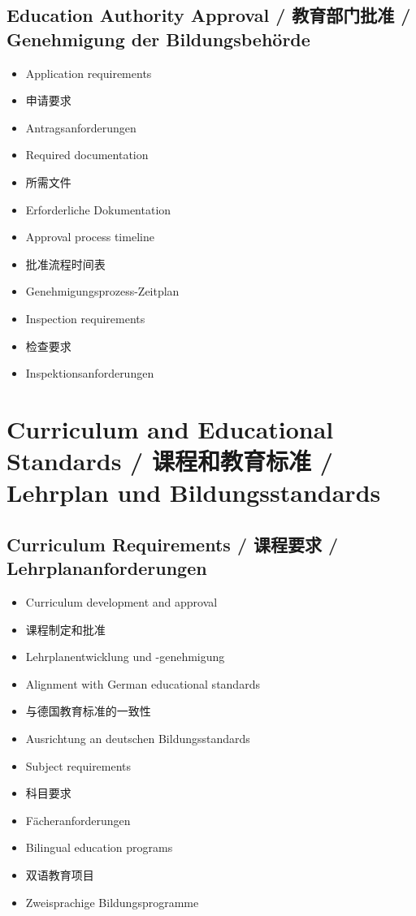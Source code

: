 \subsection{Education Authority Approval / 教育部门批准 / Genehmigung der Bildungsbehörde}
\begin{itemize}
    \item Application requirements
    \item 申请要求
    \item Antragsanforderungen
    \item Required documentation
    \item 所需文件
    \item Erforderliche Dokumentation
    \item Approval process timeline
    \item 批准流程时间表
    \item Genehmigungsprozess-Zeitplan
    \item Inspection requirements
    \item 检查要求
    \item Inspektionsanforderungen
\end{itemize}

\section{Curriculum and Educational Standards / 课程和教育标准 / Lehrplan und Bildungsstandards}

\subsection{Curriculum Requirements / 课程要求 / Lehrplananforderungen}
\begin{itemize}
    \item Curriculum development and approval
    \item 课程制定和批准
    \item Lehrplanentwicklung und -genehmigung
    \item Alignment with German educational standards
    \item 与德国教育标准的一致性
    \item Ausrichtung an deutschen Bildungsstandards
    \item Subject requirements
    \item 科目要求
    \item Fächeranforderungen
    \item Bilingual education programs
    \item 双语教育项目
    \item Zweisprachige Bildungsprogramme
\end{itemize}

